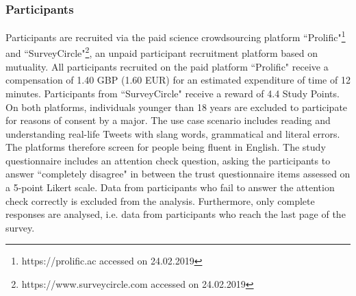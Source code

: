 \subsubsection{Participants}
Participants are recruited via the paid science crowdsourcing platform ``Prolific"\footnote{https://prolific.ac accessed on 24.02.2019} and ``SurveyCircle"\footnote{https://www.surveycircle.com accessed on 24.02.2019}, an unpaid participant recruitment platform based on mutuality. All participants recruited on the paid platform ``Prolific" receive a compensation of 1.40 GBP (1.60 EUR) for an estimated expenditure of time of 12 minutes. Participants from ``SurveyCircle" receive a reward of 4.4 Study Points. On both platforms, individuals younger than 18 years are excluded to participate for reasons of consent by a major. The use case scenario includes reading and understanding real-life Tweets with slang words, grammatical and literal errors. The platforms therefore screen for people being fluent in English. The study questionnaire includes an attention check question, asking the participants to answer ``completely disagree" in between the trust questionnaire items assessed on a 5-point Likert scale. Data from participants who fail to answer the attention check correctly is excluded from the analysis. Furthermore, only complete responses are analysed, i.e. data from participants who reach the last page of the survey.








